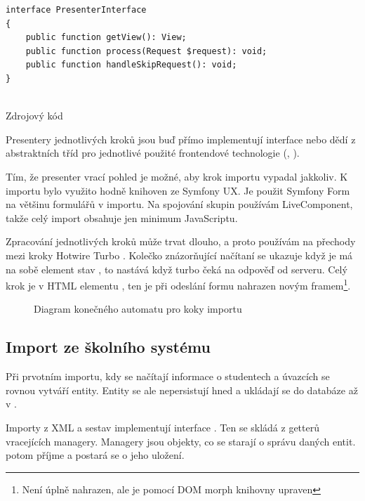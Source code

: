 \begin{code}
  \begin{verbatim}
interface PresenterInterface
{
    public function getView(): View;
    public function process(Request $request): void;
    public function handleSkipRequest(): void;
}
 
    \end{verbatim}
    \caption{Zdrojový kód }

\end{code}


Presentery jednotlivých kroků jsou buď přímo implementují interface nebo dědí z abstraktních tříd
pro jednotlivé použité frontendové technologie (, ).

Tím, že presenter vrací pohled je možné, aby krok importu vypadal jakkoliv.
K importu bylo využito hodně knihoven ze Symfony UX.
Je použit Symfony Form na většinu formulářů v importu.
Na spojování skupin používám LiveComponent, takže celý import obsahuje jen minimum JavaScriptu.

Zpracování jednotlivých kroků může trvat dlouho, a proto používám na přechody mezi kroky Hotwire Turbo .
Kolečko znázorňující načítaní se ukazuje když je má na sobě element  stav , to nastává když turbo čeká na odpověď od serveru.
Celý krok je v HTML elementu , ten je při odeslání formu nahrazen novým framem\footnote{Není úplně nahrazen, ale je pomocí DOM morph knihovny upraven}.


\clearpage

\begin{figure}
	\centering
\resizebox{!}{0.95\textheight}{\huge{}}
  \caption{Diagram konečného automatu pro koky importu}
  \label{postup:import-diagram}
\end{figure}


\clearpage



\subsection{Import ze školního systému}
Při prvotním importu, kdy se načítají informace o studentech a úvazcích se rovnou vytváří entity. Entity se ale nepersistují hned a ukládají se do databáze až v .

Importy z XML a sestav implementují interface . Ten se skládá z getterů vracejících managery. Managery jsou objekty, co se starají o správu daných entit.  potom příjme  a postará se o jeho uložení. 

